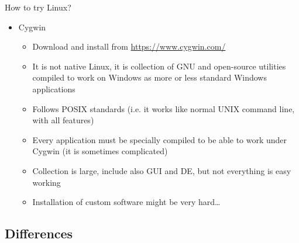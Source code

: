 \documentclass[compress, xelatex, 11pt, xcolor=svgnames, aspectratio=169,
	hyperref={
		bookmarks=true,
		unicode=true,
		colorlinks=true,
		pdftitle={Linux, command line and MetaCentrum},
		plainpages=false,
		pdfauthor={Vojtech Zeisek},
		pdfsubject={Course about use of Linux command line, writing shell scripts and using MetaCentrum of CESNET},
		pdfcreator={XeLaTeX},
		pdfkeywords={Linux, GNU, BASH, shell, command line, MetaCentrum},
		linkcolor=DarkRed, %
		anchorcolor=DarkBlue, %
		citecolor=Indigo, %
		filecolor=NavyBlue, %
		menucolor=DarkMagenta, %
		urlcolor=DarkBlue, %
		},
	url={hyphens, lowtilde} %
	]{beamer}
\begin{document}
\begin{frame}[allowframebreaks]{How to try Linux?}
\begin{itemize}
		\begin{itemize}
			\item To install follow \url{https://docs.microsoft.com/windows/wsl/about}
			\item Version 1 only for command-line applications (it has some problems with paths, text files,~\ldots)
			\item Version 2 works well for most of tasks and allows GUI (experimental)
		\end{itemize}
		\item Cygwin
		\begin{itemize}
			\item Download and install from \url{https://www.cygwin.com/}
			\item It is not native Linux, it is collection of GNU and open-source utilities compiled to work on Windows as more or less standard Windows applications
			\item Follows POSIX standards (i.e. it works like normal UNIX command line, with all features)
			\item Every application must be specially compiled to be able to work under Cygwin (it is sometimes complicated)
			\item Collection is large, include also GUI and DE, but not everything is easy working
			\item Installation of custom software might be very hard\ldots
		\end{itemize}
	\end{itemize}
\end{frame}

\subsection{Differences}
\end{document}
